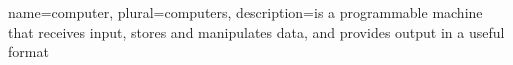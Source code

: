 
%
%

%
%
{
    name=computer,
    plural=computers,
    description={is a programmable machine that receives input,
    stores and manipulates data, and provides
    output in a useful format}
}
